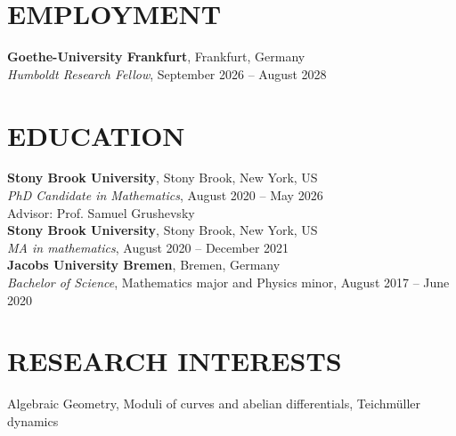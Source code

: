 \documentclass[margin]{res}
\begin{document}

\address{700 Health Sciences Drive\\Chapin-B-1015C\\11790 Stony Brook, New York, US}
\address{prabhat.devkota@stonybrook.edu\\\url{https://p-devkota.github.io}}

\begin{resume}

  \section{EMPLOYMENT}
  \textbf{Goethe-University Frankfurt}, Frankfurt, Germany\\
  {\sl Humboldt Research Fellow}, September 2026 -- August 2028\\

  \section{EDUCATION}
  \textbf{Stony Brook University}, Stony Brook, New York, US\\
  {\sl PhD Candidate in Mathematics}, August 2020 -- May 2026\\
  Advisor: Prof. Samuel Grushevsky\\

  \textbf{Stony Brook University}, Stony Brook, New York, US\\
  {\sl MA in mathematics}, August 2020 -- December 2021\\
  
\textbf{Jacobs University Bremen}, Bremen, Germany\\
{\sl Bachelor of Science}, Mathematics major and Physics minor, August 2017 -- June 2020
\\
\section{RESEARCH INTERESTS}
Algebraic Geometry, Moduli of curves and abelian differentials, Teichmüller dynamics
\\


\end{resume}
\end{document}
